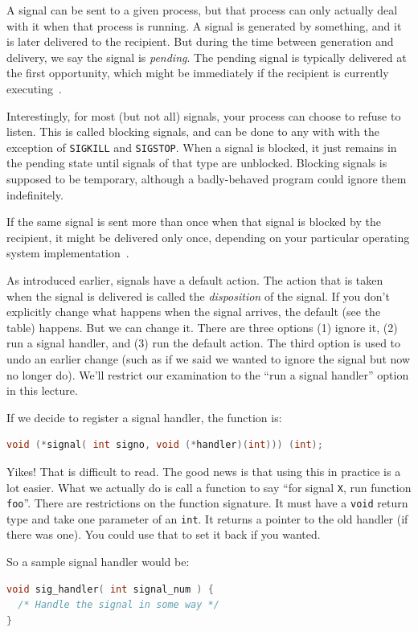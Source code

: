 A signal can be sent to a given process, but that process can only actually deal with it when that process is running. A signal is generated by something, and it is later delivered to the recipient. But during the time between generation and delivery, we say the signal is \textit{pending}. The pending signal is typically delivered at the first opportunity, which might be immediately if the recipient is currently executing~\cite{lpi}.

Interestingly, for most (but not all) signals, your process can choose to refuse to listen.  This is called blocking signals, and can be done to any with with the exception of \texttt{SIGKILL} and \texttt{SIGSTOP}. When a signal is blocked, it just remains in the pending state until signals of that type are unblocked. Blocking signals is supposed to be temporary, although a badly-behaved program could ignore them indefinitely.

If the same signal is sent more than once when that signal is blocked by the recipient, it might be delivered only once, depending on your particular operating system implementation~\cite{apunix}.

As introduced earlier, signals have a default action. The action that is taken when the signal is delivered is called the \textit{disposition} of the signal. If you don't explicitly change what happens when the signal arrives, the default (see the table) happens. But we can change it. There are three options (1) ignore it, (2) run a signal handler, and (3) run the default action. The third option is used to undo an earlier change (such as if we said we wanted to ignore the signal but now no longer do). We'll restrict our examination to the ``run a signal handler'' option in this lecture.

If we decide to register a signal handler, the function is:
\begin{lstlisting}[language=C]
void (*signal( int signo, void (*handler)(int))) (int);
\end{lstlisting}

Yikes! That is difficult to read. The good news is that using this in practice is a lot easier. What we actually do is call a function to say ``for signal \texttt{X}, run function \texttt{foo}''. There are restrictions on the function signature. It must have a \texttt{void} return type and take one parameter of an \texttt{int}. It returns a pointer to the old handler (if there was one). You could use that to set it back if you wanted.

So a sample signal handler would be:
\begin{lstlisting}[language=C]
void sig_handler( int signal_num ) {
  /* Handle the signal in some way */
}
\end{lstlisting}

